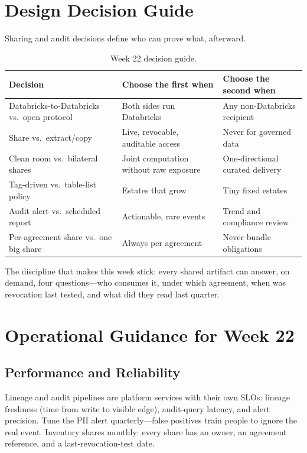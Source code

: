 \section{Design Decision Guide}
%
Sharing and audit decisions define who can prove what, afterward.

\begin{table}[H]
\centering
\small
\begin{tabular}{@{}p{3.4cm}p{4.4cm}p{4.6cm}@{}}
\toprule
\textbf{Decision} & \textbf{Choose the first when} & \textbf{Choose the second when} \\
\midrule
Databricks-to-Databricks vs.\ open protocol & Both sides run Databricks & Any non-Databricks recipient \\
Share vs.\ extract/copy & Live, revocable, auditable access & Never for governed data \\
Clean room vs.\ bilateral shares & Joint computation without raw exposure & One-directional curated delivery \\
Tag-driven vs.\ table-list policy & Estates that grow & Tiny fixed estates \\
Audit alert vs.\ scheduled report & Actionable, rare events & Trend and compliance review \\
Per-agreement share vs.\ one big share & Always per agreement & Never bundle obligations \\
\bottomrule
\end{tabular}
\caption{Week 22 decision guide.}
\label{tab:ch22-decisions}
\end{table}

The discipline that makes this week stick: every shared artifact can answer, on demand, four questions---who consumes it, under which agreement, when was revocation last tested, and what did they read last quarter.

\section{Operational Guidance for Week 22}
%
\subsection{Performance and Reliability}
Lineage and audit pipelines are platform services with their own SLOs: lineage freshness (time from write to visible edge), audit-query latency, and alert precision. Tune the PII alert quarterly---false positives train people to ignore the real event. Inventory shares monthly: every share has an owner, an agreement reference, and a last-revocation-test date.

